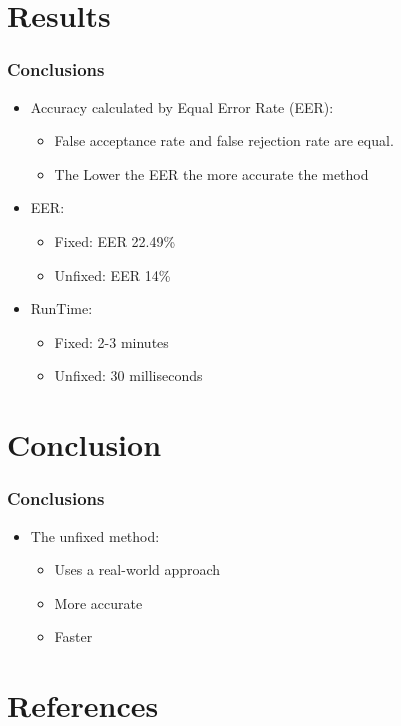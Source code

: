 \documentclass{beamer}
\begin{document}
\section[Results]{Results}
\begin{frame}
\frametitle{Conclusions}
	\begin{itemize}
		\item Accuracy calculated by Equal Error Rate (EER): 
			\begin{itemize}
			\item False acceptance rate and false rejection rate are equal. 
			\item The Lower the EER the more accurate the method
			\end{itemize}
			\item EER:
			\begin{itemize}
			\item Fixed: EER 22.49\%
			\item Unfixed: EER 14\%
			\end{itemize}
			\item RunTime: 
			\begin{itemize}
				\item Fixed: 2-3 minutes
				\item Unfixed: 30 milliseconds
			\end{itemize}
				
	\end{itemize}
	
\end{frame}


\section[Conclusion]{Conclusion}
\begin{frame}
\frametitle{Conclusions}
	\begin{itemize}
		\item The unfixed method:
			\begin{itemize}
				\item Uses a real-world approach 
				\item More accurate
				\item Faster
			\end{itemize}
	\end{itemize}
	
\end{frame}






\section*{References}
\end{document}

